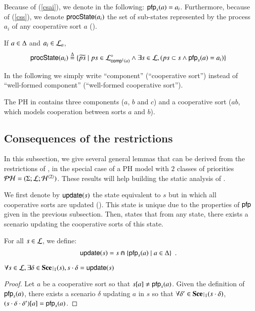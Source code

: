 Because of (\ref{csai}), we denote in the following: $\pfp_s(a) = a_i$.
Furthermore, because of (\ref{css}), we denote $\csState(a_i)$ the set of sub-states represented by the process $a_i$ of any cooperative sort $a$ ().
\begin{definition}[$\csState : \PHproc \rightarrow \powerset(\PHproc)$]
\label{def:csState}
  If $a \in \cs$ and $a_i \in \PHl_a$, 
  $$\csState(a_i) \DEF \{ \toset{ps} \mid ps\in\PHsubl[\PHl]_{\compin(a)} \wedge
  							\exists s\in\PHl, (ps\subset s\wedge \pfp_s(a)=a_i)
							\}$$
\end{definition}

In the following we simply write “component” (\resp “cooperative sort”) instead of “well-formed component” (\resp “well-formed cooperative sort”).

\begin{example}
  The PH in  contains three components ($a$, $b$ and $c$) and a cooperative sort ($ab$, which models cooperation between sorts $a$ and $b$).
\end{example}


\subsection{Consequences of the restrictions}

In this subsection, we give several general lemmas that can be derived from the restrictions of , %
in the special case of a PH model with $2$ classes of priorities $\PH = (\PHs; \PHl; \PHa^{\langle 2 \rangle})$.
These results will help building the static analysis of .

We first denote by $\update(s)$ the state equivalent to $s$ but in which all cooperative sorts are updated ().
This state is unique due to the properties of $\pfp$ given in the previous subsection.
Then,  states that from any state, there exists a scenario updating the cooperative sorts of this state.
%
\begin{definition}[$\update : \PHl \rightarrow \PHl$]
\label{def:update}
  For all $s \in \PHl$, we define:
  \begin{align*}
    \update(s) = s \Cap \{ \pfp_{s}(a) \mid a \in \cs \} \enspace.
  \end{align*}
\end{definition}
%
\begin{lemma}
\label{lem:update}
  $\forall s \in \PHl, \exists \delta \in \restriction{\Sce}{1}(s), s \PHplay \delta = \update(s)$
\end{lemma}
%
\begin{proof}
  Let $a$ be a cooperative sort so that $\PHget{s}{a} \neq \pfp_s(a)$.
  Given the definition of $\pfp_s(a)$, there exists a scenario $\delta$ updating $a$ in $s$ so that
  $\forall \delta' \in \restriction{\Sce}{1}(s \PHplay \delta)$, $\PHget{(s \PHplay \delta \PHplay \delta')}{a} = \pfp_s(a)$.
\end{proof}

